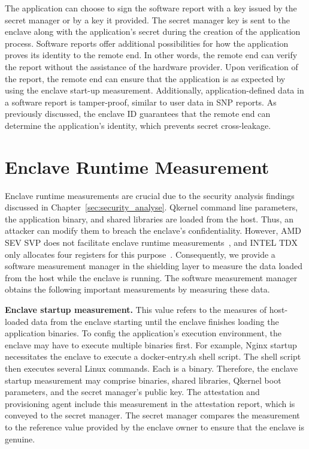 The application can choose to sign the software report with a key issued by the secret manager or by a key it provided. The secret manager key is sent to the enclave along with the application's secret during the creation of the application process. 
Software reports offer additional possibilities for how the application proves its identity to the remote end. In other words, the remote end can verify the report without the assistance of the hardware provider. Upon verification of the report, 
the remote end can ensure that the application is as expected by using the enclave start-up measurement. Additionally, application-defined data in a software report is tamper-proof, similar to user data in SNP reports. As previously discussed, the 
enclave ID guarantees that the remote end can determine the application's identity, which prevents secret cross-leakage.



\section{Enclave Runtime Measurement}
Enclave runtime measurements are crucial due to the security analysis findings discussed in Chapter~\ref{sec:security_analyse}. Qkernel command line parameters, the application binary, and shared libraries are loaded from the host. Thus, an attacker can modify them 
to breach the enclave's confidentiality. However, AMD SEV SVP does not facilitate enclave runtime measurements~\cite*{snp_firmware}, and INTEL TDX only allocates four registers for this purpose~\cite*{Intel_tdx_whitepaper}. Consequently, we provide a software measurement manager in the shielding 
layer to measure the data loaded from the host while the enclave is running. The software measurement manager obtains the following important measurements by measuring these data.

\textbf{Enclave startup measurement.} This value refers to the measures of host-loaded data from the enclave starting until the enclave finishes loading the application binaries. To config the application's execution environment, the enclave may have to 
execute multiple binaries first. For example, Nginx startup necessitates the enclave to execute a docker-entry.sh shell script\cite*{nginx}. The shell script then executes several Linux commands. Each is a binary. Therefore, the enclave startup measurement may 
comprise binaries, shared libraries, Qkernel boot parameters, and the secret manager's public key. The attestation and provisioning agent include this measurement in the attestation report, which is conveyed to the secret manager. The secret manager 
compares the measurement to the reference value provided by the enclave owner to ensure that the enclave is genuine.

